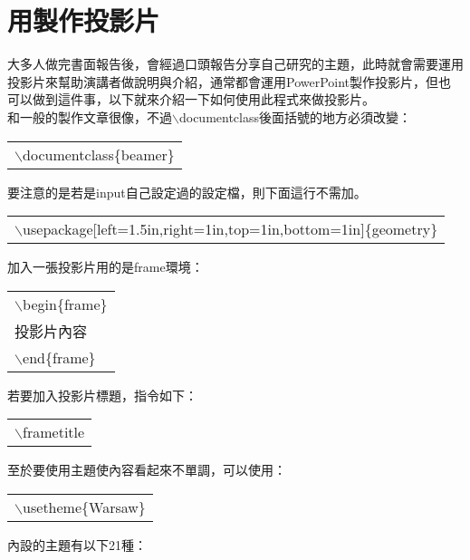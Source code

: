 \documentclass[12pt, a4paper]{article}
\begin{document}
\section{{用\XeLaTeX  製作投影片}}
大多人做完書面報告後，會經過口頭報告分享自己研究的主題，此時就會需要運用投影片來幫助演講者做說明與介紹，通常都會運用PowerPoint製作投影片，但\XeLaTeX 也可以做到這件事，以下就來介紹一下如何使用此程式來做投影片。\\
和一般的製作文章很像，不過$\backslash$documentclass後面括號的地方必須改變：
\begin{center}\colorbox{slight}{\begin{tabular}{p{}}
	{$\backslash$documentclass\{beamer\}}
\end{tabular}}
\end{center}
要注意的是若是input自己設定過的設定檔，則下面這行不需加。
\begin{center}\colorbox{slight}{\begin{tabular}{p{}}
	{$\backslash$usepackage[left=1.5in,right=1in,top=1in,bottom=1in]\{geometry\} }
\end{tabular}}
\end{center}
加入一張投影片用的是frame環境：
\begin{center}\colorbox{slight}{\begin{tabular}{p{}}
	$\backslash$begin\{frame\}\\
	投影片內容\\
	$\backslash$end\{frame\}\\
\end{tabular}}
\end{center}
若要加入投影片標題，指令如下：
	\begin{center}\colorbox{slight}{\begin{tabular}{p{}}
	{$\backslash$frametitle}
\end{tabular}}
\end{center}
至於要使用主題使內容看起來不單調，可以使用：
\begin{center}\colorbox{slight}{\begin{tabular}{p{}}
	{$\backslash$usetheme\{Warsaw\}}
\end{tabular}}
\end{center}
內設的主題有以下21種：
\end{document}
